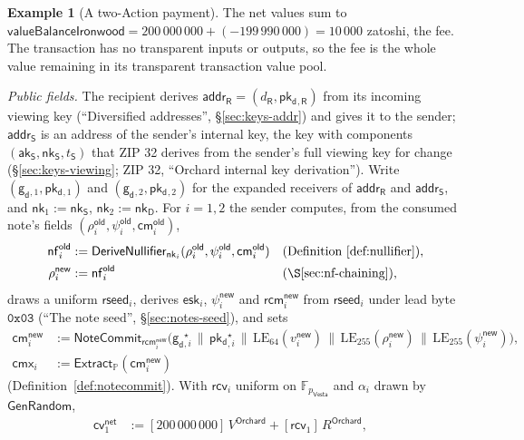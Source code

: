 \documentclass[11pt,a4paper]{article}
\theoremstyle{definition}
\newtheorem{example}[theorem]{Example}
\newcommand{\F}{\mathbb{F}}
\newcommand{\PP}{\mathbb{P}}
\newcommand{\nfsym}{\mathsf{nf}}
\newcommand{\cmsym}{\mathsf{cm}}
\newcommand{\cmx}{\mathsf{cmx}}
\newcommand{\cvsym}{\mathsf{cv}}
\newcommand{\Vesta}{\ensuremath{\mathsf{Vesta}}}
\newcommand{\NoteCommit}{\ensuremath{\mathsf{NoteCommit}}}
\newcommand{\Extract}{\ensuremath{\mathsf{Extract}}}
\newcommand{\aksym}{\ensuremath{\mathsf{ak}}}
\newcommand{\nksym}{\ensuremath{\mathsf{nk}}}
\newcommand{\pkd}{\ensuremath{\mathsf{pk_d}}}
\newcommand{\gd}{\ensuremath{\mathsf{g_d}}}
\newcommand{\rcv}{\ensuremath{\mathsf{rcv}}}
\newcommand{\rcm}{\ensuremath{\mathsf{rcm}}}
\begin{document}
\begin{example}[A two-Action payment]
The net values sum to
$\mathsf{valueBalanceIronwood} = 200\,000\,000 + (-199\,990\,000) =
10\,000$ zatoshi, the fee. The transaction has no transparent inputs or
outputs, so the fee is the whole value remaining in its transparent
transaction value pool.

\emph{Public fields.} The recipient derives
$\mathsf{addr}_{\mathsf{R}} = (d_{\mathsf{R}}, \pkd{}_{,\mathsf{R}})$ from
its incoming viewing key (``Diversified addresses'', \S\ref{sec:keys-addr})
and gives it to the sender; $\mathsf{addr}_{\mathsf{S}}$ is an address of
the sender's internal key, the key with components $(\aksym_{\mathsf{S}},
\nksym_{\mathsf{S}}, t_{\mathsf{S}})$ that ZIP 32 derives from the sender's
full viewing key for change (\S\ref{sec:keys-viewing}; ZIP 32, ``Orchard
internal key derivation''). Write $(\gd{}_{,1}, \pkd{}_{,1})$ and
$(\gd{}_{,2}, \pkd{}_{,2})$ for the expanded receivers of
$\mathsf{addr}_{\mathsf{R}}$ and $\mathsf{addr}_{\mathsf{S}}$, and
$\nksym_1 := \nksym_{\mathsf{S}}$, $\nksym_2 := \nksym_{\mathsf{D}}$. For
$i = 1, 2$ the sender computes, from the consumed note's fields
$(\rho^{\mathsf{old}}_i, \psi^{\mathsf{old}}_i, \cmsym^{\mathsf{old}}_i)$,
\begin{align*}
  \nfsym^{\mathsf{old}}_i &:= \mathsf{DeriveNullifier}_{\nksym_i}(
    \rho^{\mathsf{old}}_i, \psi^{\mathsf{old}}_i, \cmsym^{\mathsf{old}}_i)
    && \text{(Definition~\ref{def:nullifier})}, \\
  \rho^{\mathsf{new}}_i &:= \nfsym^{\mathsf{old}}_i
    && \text{(\S\ref{sec:nf-chaining})},
\end{align*}
draws a uniform $\mathsf{rseed}_i$, derives $\mathsf{esk}_i$,
$\psi^{\mathsf{new}}_i$ and $\rcm^{\mathsf{new}}_i$ from $\mathsf{rseed}_i$
under lead byte $\mathtt{0x03}$ (``The note seed'', \S\ref{sec:notes-seed}),
and sets
\begin{align*}
  \cmsym^{\mathsf{new}}_i &:= \NoteCommit_{\rcm^{\mathsf{new}}_i}\bigl(
    \gd{}_{,i}^{\star} \,\|\, \pkd{}_{,i}^{\star} \,\|\,
    \mathrm{LE}_{64}(v^{\mathsf{new}}_i) \,\|\,
    \mathrm{LE}_{255}(\rho^{\mathsf{new}}_i) \,\|\,
    \mathrm{LE}_{255}(\psi^{\mathsf{new}}_i)\bigr), \\
  \cmx_i &:= \Extract_{\PP}(\cmsym^{\mathsf{new}}_i)
\end{align*}
(Definition~\ref{def:notecommit}). With $\rcv_i$ uniform on
$\F_{p_{\Vesta}}$ and $\alpha_i$ drawn by $\mathsf{GenRandom}$,
\begin{align*}
  \cvsym^{\mathsf{net}}_1 &:= [200\,000\,000]\,V^{\mathsf{Orchard}}
    + [\rcv_1]\,R^{\mathsf{Orchard}}, &

\end{align*}
\end{example}
\end{document}
